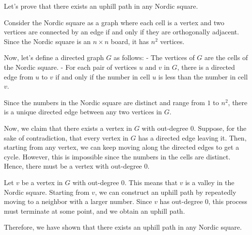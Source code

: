 Let's prove that there exists an uphill path in any Nordic square.

Consider the Nordic square as a graph where each cell is a vertex and two vertices are connected by an edge if and only if they are orthogonally adjacent. Since the Nordic square is an $n \times n$ board, it has $n^2$ vertices.

Now, let's define a directed graph $G$ as follows:
- The vertices of $G$ are the cells of the Nordic square.
- For each pair of vertices $u$ and $v$ in $G$, there is a directed edge from $u$ to $v$ if and only if the number in cell $u$ is less than the number in cell $v$.

Since the numbers in the Nordic square are distinct and range from $1$ to $n^2$, there is a unique directed edge between any two vertices in $G$.

Now, we claim that there exists a vertex in $G$ with out-degree $0$.  
Suppose, for the sake of contradiction, that every vertex in $G$ has a directed edge leaving it. Then, starting from any vertex, we can keep moving along the directed edges to get a cycle. However, this is impossible since the numbers in the cells are distinct. Hence, there must be a vertex with out-degree $0$.

Let $v$ be a vertex in $G$ with out-degree $0$. This means that $v$ is a valley in the Nordic square.  
Starting from $v$, we can construct an uphill path by repeatedly moving to a neighbor with a larger number. Since $v$ has out-degree $0$, this process must terminate at some point, and we obtain an uphill path.

Therefore, we have shown that there exists an uphill path in any Nordic square.

